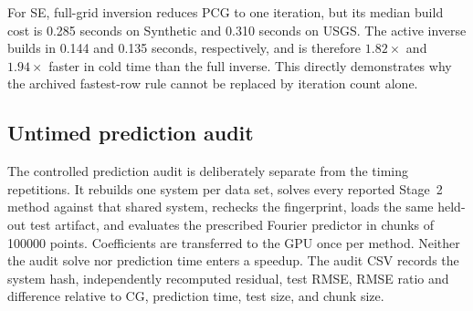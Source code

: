 \begin{table}[H]
\centering
\scriptsize
\setlength{\tabcolsep}{2.6pt}
\caption{Matched archived-configuration bridge. Each entry is median
iterations / old-runner construction-plus-solve seconds / paired speedup over
CG; active-method score selection is not included.  Entries in different
columns are separate fixed-system cases and are not combined.}
\label{tab:matched-q128-bridge}
\end{table}

For SE, full-grid inversion reduces PCG to one iteration, but its median build
cost is 0.285 seconds on Synthetic and 0.310 seconds on USGS.  The active
inverse builds in 0.144 and 0.135 seconds, respectively, and is therefore
\(1.82\times\) and \(1.94\times\) faster in cold time than the full inverse.
This directly demonstrates why the archived fastest-row rule cannot be
replaced by iteration count alone.

\subsection{Untimed prediction audit}

The controlled prediction audit is deliberately separate from the timing
repetitions.  It rebuilds one system per data set, solves every reported
Stage~2 method against that shared system, rechecks the fingerprint, loads the same held-out
test artifact, and evaluates the prescribed Fourier predictor in chunks of
100000 points.  Coefficients are transferred to the GPU once per method.
Neither the audit solve nor prediction time enters a speedup.  The audit CSV
records the system hash, independently recomputed residual, test RMSE, RMSE
ratio and difference relative to CG, prediction time, test size, and chunk
size.
